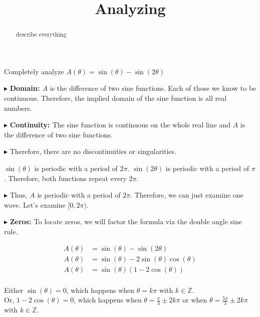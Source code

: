 \documentclass{ximera}
\title{Analyzing}
\begin{document}
\begin{abstract}
describe everything
\end{abstract}
\maketitle







Completely analyze $A(\theta) = \sin(\theta) - \sin(2\theta)$

$\blacktriangleright$  \textbf{\textcolor{blue!55!black}{Domain: }} $A$ is the difference of two sine functions.  Each of those we know to be continuous. Therefore, the implied domain of the sine function is all real numbers.

$\blacktriangleright$ \textbf{\textcolor{blue!55!black}{Continuity: }}  The sine function is continuous on the whole real line and $A$ is the difference of two sine functions.

$\blacktriangleright$  Therefore, there are no discontinuities or singularities.


$\sin(\theta)$ is periodic with a period of $2\pi$. $\sin(2\theta)$ is periodic with a period of $\pi$. Therefore, both functions repeat every $2\pi$.

$\blacktriangleright$ Thus, $A$ is periodic with a period of $2\pi$.  Therefore, we can just examine one wave.  Let's examine $[0,2\pi)$.






$\blacktriangleright$ \textbf{\textcolor{blue!55!black}{Zeros: }} To locate zeros, we will factor the formula via the double angle sine rule.  




\begin{align*}
A(\theta)   &  = \sin(\theta) - \sin(2\theta)  \\
A(\theta)   &  = \sin(\theta) - 2\sin(\theta)\cos(\theta)   \\
A(\theta)   &  = \sin(\theta) (1 - 2\cos(\theta))   \\
\end{align*}



Either $\sin(\theta) = 0$, which happens when $\theta = k\pi$ with $k \in \mathbb{Z}$. \\
Or, $1 - 2\cos(\theta) = 0$, which happens when $\theta = \frac{\pi}{3} \pm 2k\pi$ or when $\theta = \frac{5\pi}{3} \pm 2k\pi$ with $k \in \mathbb{Z}$.
\end{document}
